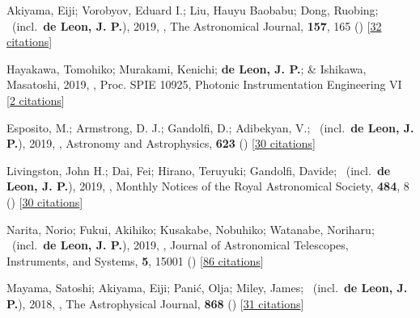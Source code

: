 \item[{\color{numcolor}\scriptsize12}] Akiyama, Eiji; Vorobyov, Eduard I.; Liu, Hauyu Baobabu; Dong, Ruobing; \etal\ (incl.\ \textbf{de Leon, J. P.}), 2019, , The Astronomical Journal, \textbf{157}, 165 () [\href{https://ui.adsabs.harvard.edu/abs/2019AJ....157..165A}{32 citations}]

\item[{\color{numcolor}\scriptsize11}] Hayakawa, Tomohiko; Murakami, Kenichi; \textbf{de Leon, J. P.}; \& Ishikawa, Masatoshi, 2019, , Proc. SPIE 10925, Photonic Instrumentation Engineering VI [\href{https://www.spiedigitallibrary.org/conference-proceedings-of-spie/10925/1092507/Focus-adjustable-motion-blur-compensation-method-using-deformable-mirror/10.1117/12.2509567.short}{2 citations}]

\item[{\color{numcolor}\scriptsize10}] Esposito, M.; Armstrong, D. J.; Gandolfi, D.; Adibekyan, V.; \etal\ (incl.\ \textbf{de Leon, J. P.}), 2019, , Astronomy and Astrophysics, \textbf{623} () [\href{https://ui.adsabs.harvard.edu/abs/2019A&A...623A.165E}{30 citations}]

\item[{\color{numcolor}\scriptsize9}] Livingston, John H.; Dai, Fei; Hirano, Teruyuki; Gandolfi, Davide; \etal\ (incl.\ \textbf{de Leon, J. P.}), 2019, , Monthly Notices of the Royal Astronomical Society, \textbf{484}, 8 () [\href{https://ui.adsabs.harvard.edu/abs/2019MNRAS.484....8L}{30 citations}]

\item[{\color{numcolor}\scriptsize8}] Narita, Norio; Fukui, Akihiko; Kusakabe, Nobuhiko; Watanabe, Noriharu; \etal\ (incl.\ \textbf{de Leon, J. P.}), 2019, , Journal of Astronomical Telescopes, Instruments, and Systems, \textbf{5}, 15001 () [\href{https://ui.adsabs.harvard.edu/abs/2019JATIS...5a5001N}{86 citations}]

\item[{\color{numcolor}\scriptsize7}] Mayama, Satoshi; Akiyama, Eiji; Pani{\'c}, Olja; Miley, James; \etal\ (incl.\ \textbf{de Leon, J. P.}), 2018, , The Astrophysical Journal, \textbf{868} () [\href{https://ui.adsabs.harvard.edu/abs/2018ApJ...868L...3M}{31 citations}]

